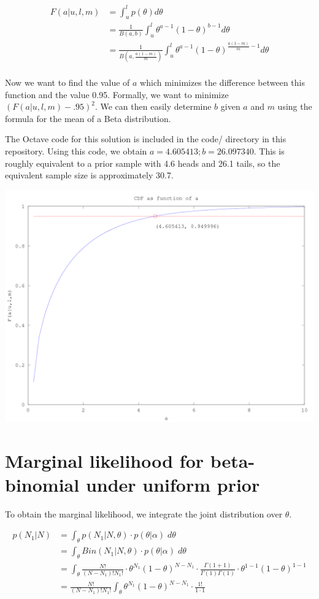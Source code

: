 \documentclass{article}
\begin{document}
\begin{align*}
  F(a|u,l,m) &= \int_u^l p(\theta) d\theta \\
             &= \frac{1}{B(a,b)} \int_u^l \theta^{a-1}(1-\theta)^{b-1}
               d\theta \\
             &= \frac{1}{B(a,\frac{a(1-m)}{m})} \int_u^l \theta^{a-1}(1-\theta)^{\frac{a(1-m)}{m}-1}
               d\theta \\
\end{align*}

Now we want to find the value of $a$ which minimizes the difference
between this function and the value 0.95. Formally, we want to
minimize $(F(a|u,l,m) - .95)^2$. We can then easily determine $b$
given $a$ and $m$ using the formula for the mean of a Beta
distribution.

The Octave code for this solution is included in the code/ directory
in this repository. Using this code, we obtain
$a = 4.605413; b = 26.097340$. This is roughly equivalent to a prior
sample with 4.6 heads and 26.1 tails, so the equivalent sample size is
approximately 30.7.

\includegraphics[scale=.5]{fig3_16}

\section{Marginal likelihood for beta-binomial under uniform prior}

To obtain the marginal likelihood, we integrate the joint distribution over $\theta$.

\begin{align*}
  p(N_1|N) &= \int_\theta p(N_1|N, \theta) \cdot p(\theta|\alpha) \; d\theta \\
           &= \int_\theta Bin(N_1|N, \theta) \cdot p(\theta|\alpha) \; d\theta \\
           &= \int_\theta \frac{N!}{(N-N_1)!N_1!} \cdot \theta^{N_1}(1
             - \theta)^{N - N_1} \cdot \frac{\Gamma(1 +
             1)}{\Gamma(1)\Gamma(1)} \cdot \theta^{1 - 1} (1 - \theta)^{1 -
             1} \\
           &= \frac{N!}{(N-N_1)!N_1!} \int_\theta \theta^{N_1}(1
             - \theta)^{N - N_1} \cdot \frac{1!}{1 \cdot 1}
\end{align*}
\end{document}
